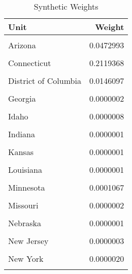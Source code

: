 \begin{table}[H]

\caption{\label{tab:unit_weight_table_washington}Synthetic Weights}
\centering
\begin{tabular}[t]{lr}
\toprule
Unit & Weight\\
\midrule
\cellcolor{gray!6}{Alabama} & \cellcolor{gray!6}{0.0000050}\\
Arizona & 0.0472993\\
\cellcolor{gray!6}{Arkansas} & \cellcolor{gray!6}{0.0000002}\\
Connecticut & 0.2119368\\
\cellcolor{gray!6}{Delaware} & \cellcolor{gray!6}{0.0000005}\\
\addlinespace
District of Columbia & 0.0146097\\
\cellcolor{gray!6}{Florida} & \cellcolor{gray!6}{0.2821796}\\
Georgia & 0.0000002\\
\cellcolor{gray!6}{Hawaii} & \cellcolor{gray!6}{0.0477572}\\
Idaho & 0.0000008\\
\addlinespace
\cellcolor{gray!6}{Illinois} & \cellcolor{gray!6}{0.0000009}\\
Indiana & 0.0000001\\
\cellcolor{gray!6}{Iowa} & \cellcolor{gray!6}{0.0000001}\\
Kansas & 0.0000001\\
\cellcolor{gray!6}{Kentucky} & \cellcolor{gray!6}{0.0000008}\\
\addlinespace
Louisiana & 0.0000001\\
\cellcolor{gray!6}{Maryland} & \cellcolor{gray!6}{0.0000002}\\
Minnesota & 0.0001067\\
\cellcolor{gray!6}{Mississippi} & \cellcolor{gray!6}{0.0000004}\\
Missouri & 0.0000002\\
\addlinespace
\cellcolor{gray!6}{Montana} & \cellcolor{gray!6}{0.1148561}\\
Nebraska & 0.0000001\\
\cellcolor{gray!6}{New Hampshire} & \cellcolor{gray!6}{0.0001440}\\
New Jersey & 0.0000003\\
\cellcolor{gray!6}{New Mexico} & \cellcolor{gray!6}{0.0000001}\\
\addlinespace
New York & 0.0000020\\
\cellcolor{gray!6}{North Carolina} & \cellcolor{gray!6}{0.0000012}\\

\end{tabular}
\end{table}
